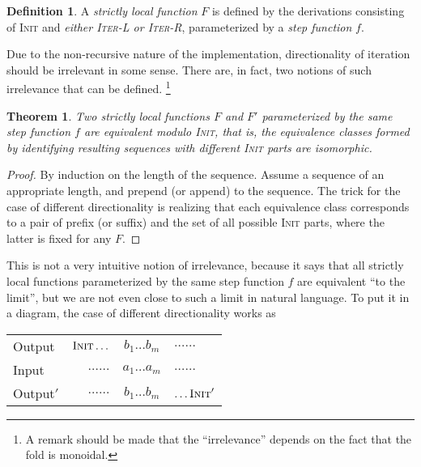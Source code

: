 \documentclass[11pt]{article}
\theoremstyle{definition}
\newtheorem{definition}{Definition}
\theoremstyle{plain}
\newtheorem{theorem}{Theorem}
\begin{document}
\begin{definition}
  A \emph{strictly local function} \(F\) is defined by the derivations
  consisting of \textsc{Init} and
  \emph{either \textsc{Iter-L} or \textsc{Iter-R}}, parameterized by a
  \emph{step function} \(f\).
\end{definition}

Due to the non-recursive nature of the implementation, directionality
of iteration should be irrelevant in some sense.  There are, in fact,
two notions of such irrelevance that can be defined.%
\footnote{A remark should be made that the \enquote{irrelevance}
  depends on the fact that the fold is monoidal.}
%

\begin{theorem}
  Two strictly local functions \(F\) and \(F'\) parameterized by the
  same step function \(f\) are \emph{equivalent modulo \textsc{Init}},
  that is, the equivalence classes formed by identifying resulting
  sequences with different \textsc{Init} parts are isomorphic.
  \label{thm:eq-mod-init}
\end{theorem}

\begin{proof}
  By induction on the length of the sequence.  Assume a sequence of an
  appropriate length, and prepend (or append) to the sequence.  The
  trick for the case of different directionality is realizing that
  each equivalence class corresponds to a pair of prefix (or suffix)
  and the set of all possible \textsc{Init} parts, where the latter is
  fixed for any \(F\).
\end{proof}

This is not a very intuitive notion of irrelevance, because it says
that all strictly local functions parameterized by the same step
function \(f\) are equivalent \enquote{to the limit}, but we are not
even close to such a limit in natural language.  To put it in a
diagram, the case of different directionality works as

\begin{table}[h]
  \centering
  \begin{tabular}{lrcl}
    Output
    & \(\textsc{Init} \ldots\)
    & \(b_{1} \ldots b_{m}\)
    & \(\ldots \ldots\) \\
    Input
    & \(\ldots \ldots\)
    & \(a_{1} \ldots a_{m}\)
    & \(\ldots \ldots\) \\
    Output\('\)
    & \(\ldots \ldots\)
    & \(b_{1} \ldots b_{m}\)
    & \(\ldots \textsc{Init}'\)
  \end{tabular}
\end{table}
\end{document}
